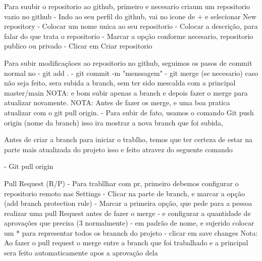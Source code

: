 Para suubir o repositorio ao github, primeiro e necesario criaum um repositorio vazio no github
 - Indo ao seu perfil do github, vai no icone de + e selecionar New repository
 - Colocar um nome unica ao seu repositorio
 - Colocar a descrição, para falar do que trata o repositorio
 - Marcar a opção conforme necesario, repositorio publico ou privado
 - Clicar em Criar repositorio

 
 Para subir modificaçãoes ao repositorio no github, seguimos os pasos de commit normal no
    - git add .
    - git commit -m "menssagem"
    - git merge (se necesario) caso não seja feito, sera subida a branch, sem ter sido mescalda com a principal master/main
    NOTA: e bom subir apenas a branch e depois fazer o merge para atualizar novamente.
    NOTA: Antes de fazer os merge, e uma boa pratica atualizar com o git pull origin.
    - Para subir de fato, usamos o comando Git push origin (nome da branch)
    isso ira mostrar a nova branch que foi subida,

Antes de criar a branch para iniciar o trablho, temos que ter certeza de estar na parte
mais atualizada do projeto isso e feito atravez do seguente comando

   - Git pull origin 

Pull Request (R/P)
   - Para trabllhar com pr, primeiro debemos configurar o repositorio remoto nas Settings 
   - Clicar na parte de branch, e marcar a opção (add branch protection rule)
   - Marcar a primeira opção, que pede para a pessoa realizar uma pull Request antes de fazer o merge
   - e configurar a quantidade de aprovações que precisa (3 normalmente)
   - em padrão de nome, e sujerido colocar um * para representar todos os brannch do projeto
   - clicar em save changes
   Nota: Ao fazer o pull request o merge entre a branch que foi trabalhado e a principal sera feito automaticamente
   apos a aprovação dela 